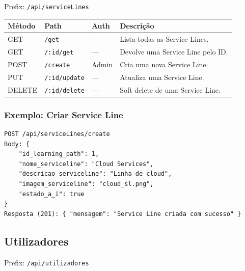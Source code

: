 \documentclass[12pt,a4paper]{article}
\begin{document}
Prefix: \texttt{/api/serviceLines}

\begin{longtable}{@{}lllp{6cm}@{}}
    \toprule
    \textbf{Método} & \textbf{Path} & \textbf{Auth} & \textbf{Descrição} \\
    \midrule
    \endhead
    \bottomrule
    \endfoot

    GET    & \texttt{/get} & --- & Lista todas as Service Lines. \\
    GET    & \texttt{/:id/get} & --- & Devolve uma Service Line pelo ID. \\
    POST   & \texttt{/create} & Admin & Cria uma nova Service Line. \\
    PUT    & \texttt{/:id/update} & --- & Atualiza uma Service Line. \\
    DELETE & \texttt{/:id/delete} & --- & Soft delete de uma Service Line. \\
\end{longtable}

\subsubsection*{Exemplo: Criar Service Line}
\begin{lstlisting}
POST /api/serviceLines/create
Body: {
    "id_learning_path": 1,
    "nome_serviceline": "Cloud Services",
    "descricao_serviceline": "Linha de cloud",
    "imagem_serviceline": "cloud_sl.png",
    "estado_a_i": true
}
Resposta (201): { "mensagem": "Service Line criada com sucesso" }
\end{lstlisting}

\subsection{Utilizadores}
\label{sec:utilizadores}

Prefix: \texttt{/api/utilizadores}
\end{document}

